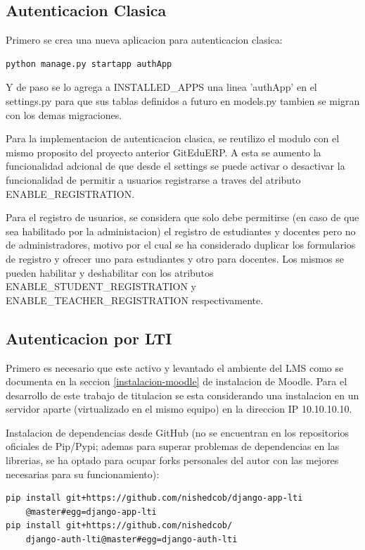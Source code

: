 \subsection{Autenticacion Clasica}

Primero se crea una nueva aplicacion para autenticacion clasica:
\begin{lstlisting}
python manage.py startapp authApp
\end{lstlisting}

Y de paso se lo agrega a INSTALLED\_APPS una linea 'authApp' en el settings.py para que sus tablas definidos a futuro en models.py tambien se migran con los demas migraciones.

Para la implementacion de autenticacion clasica, se reutilizo el modulo con el mismo proposito del proyecto anterior GitEduERP. A esta se aumento la funcionalidad adcional de que desde el settings se puede activar o desactivar la funcionalidad de permitir a usuarios registrarse a traves del atributo ENABLE\_REGISTRATION. 

Para el registro de usuarios, se considera que solo debe permitirse (en caso de que sea habilitado por la administacion) el registro de estudiantes y docentes pero no de administradores, motivo por el cual se ha considerado duplicar los formularios de registro y ofrecer uno para estudiantes y otro para docentes. Los mismos se pueden habilitar y deshabilitar con los atributos ENABLE\_STUDENT\_REGISTRATION y ENABLE\_TEACHER\_REGISTRATION respectivamente.

\subsection{Autenticacion por LTI}

Primero es necesario que este activo y levantado el ambiente del LMS como se documenta en la seccion \ref{instalacion-moodle} de instalacion de Moodle. Para el desarrollo de este trabajo de titulacion se esta considerando una instalacion en un servidor aparte (virtualizado en el mismo equipo) en la direccion IP 10.10.10.10.


Instalacion de dependencias desde GitHub (no se encuentran en los repositorios oficiales de Pip/Pypi; ademas para superar problemas de dependencias en las librerias, se ha optado para ocupar forks personales del autor con las mejores necesarias para su funcionamiento):
\begin{lstlisting}
pip install git+https://github.com/nishedcob/django-app-lti
    @master#egg=django-app-lti
pip install git+https://github.com/nishedcob/
    django-auth-lti@master#egg=django-auth-lti
\end{lstlisting}

